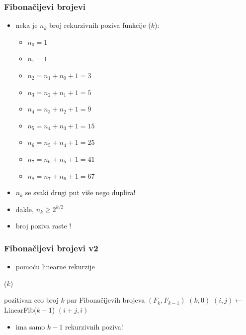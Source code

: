 \documentclass[compress,aspectratio=169]{beamer}
\begin{document}
\begin{frame}[fragile]
  \frametitle{Fibonačijevi brojevi}
\begin{itemize}
  \item neka je $n_k$ broj rekurzivnih poziva funkcije ($k$):
  \begin{itemize}
    \item $n_0 = 1$
    \item $n_1 = 1$
    \item $n_2 = n_1 + n_0 + 1 = 3$
    \item $n_3 = n_2 + n_1 + 1 = 5$
    \item $n_4 = n_3 + n_2 + 1 = 9$
    \item $n_5 = n_4 + n_3 + 1 = 15$
    \item $n_6 = n_5 + n_4 + 1 = 25$
    \item $n_7 = n_6 + n_5 + 1 = 41$
    \item $n_8 = n_7 + n_6 + 1 = 67$
  \end{itemize}
  \item $n_k$ se svaki drugi put više nego duplira!
  \item dakle, $n_k \geq 2^{k/2}$
  \item broj poziva raste !
\end{itemize}
\end{frame}

\begin{frame}[fragile]
  \frametitle{Fibonačijevi brojevi v2}
\begin{itemize}
  \item pomoću linearne rekurzije
\end{itemize}
($k$)
\begin{algorithmic}
\REQUIRE pozitivan ceo broj $k$
\ENSURE par Fibonačijevih brojeva $(F_k, F_{k-1})$
  \RETURN $(k, 0)$
\ELSE
  \STATE $(i, j) \leftarrow$ LinearFib($k-1$)
  \RETURN $(i+j, i)$
\ENDIF
\end{algorithmic}
\begin{itemize}
  \item ima samo $k-1$ rekurzivnih poziva!
\end{itemize}
\end{frame}
\end{document}
